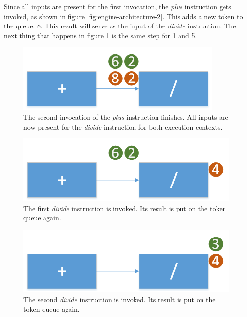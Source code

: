 Since all inputs are present for the first invocation, the \textit{plus} instruction gets invoked, as shown in figure \ref{fig:engine-architecture-2}. This adds a new token to the queue: 8. This result will serve as the input of the \textit{divide} instruction. 
The next thing that happens in figure \ref{fig:engine-architecture-3} is the same step for 1 and 5.

\begin{figure}[h!]
	\includegraphics[width=\textwidth]{images/Engine-Architecture-3.png}
	\caption{The second invocation of the \textit{plus} instruction finishes. All inputs are now present for the \textit{divide} instruction for both execution contexts.}
	\label{fig:engine-architecture-3}
\end{figure}

\begin{figure}[h!]
	\includegraphics[width=\textwidth]{images/Engine-Architecture-4.png}
	\caption{The first \textit{divide} instruction is invoked. Its result is put on the token queue again.}
	\label{fig:engine-architecture-4}
\end{figure} 

\begin{figure}[h!]
	\includegraphics[width=\textwidth]{images/Engine-Architecture-5.png}
	\caption{The second \textit{divide} instruction is invoked. Its result is put on the token queue again.}
	\label{fig:engine-architecture-5}
\end{figure}

